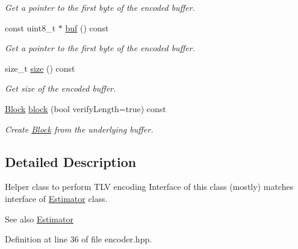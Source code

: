 \begin{DoxyCompactItemize}
\begin{DoxyCompactList}\small\item\em Get a pointer to the first byte of the encoded buffer. \end{DoxyCompactList}\item 
const uint8\+\_\+t $\ast$ \hyperlink{classndn_1_1encoding_1_1Encoder_a0cd115fa4809145fadc76aa6a9e0e504}{buf} () const\hypertarget{classndn_1_1encoding_1_1Encoder_a0cd115fa4809145fadc76aa6a9e0e504}{}\label{classndn_1_1encoding_1_1Encoder_a0cd115fa4809145fadc76aa6a9e0e504}

\begin{DoxyCompactList}\small\item\em Get a pointer to the first byte of the encoded buffer. \end{DoxyCompactList}\item 
size\+\_\+t \hyperlink{classndn_1_1encoding_1_1Encoder_ae5a65e998b6f12594897b30f9cf90943}{size} () const\hypertarget{classndn_1_1encoding_1_1Encoder_ae5a65e998b6f12594897b30f9cf90943}{}\label{classndn_1_1encoding_1_1Encoder_ae5a65e998b6f12594897b30f9cf90943}

\begin{DoxyCompactList}\small\item\em Get size of the encoded buffer. \end{DoxyCompactList}\item 
\hyperlink{classndn_1_1Block}{Block} \hyperlink{classndn_1_1encoding_1_1Encoder_a37a3f9744f1fe2be7b35a5fd7827bd3b}{block} (bool verify\+Length=true) const
\begin{DoxyCompactList}\small\item\em Create \hyperlink{classndn_1_1Block}{Block} from the underlying buffer. \end{DoxyCompactList}\end{DoxyCompactItemize}


\subsection{Detailed Description}
Helper class to perform T\+LV encoding Interface of this class (mostly) matches interface of \hyperlink{classndn_1_1encoding_1_1Estimator}{Estimator} class. 

\begin{DoxySeeAlso}{See also}
\hyperlink{classndn_1_1encoding_1_1Estimator}{Estimator} 
\end{DoxySeeAlso}


Definition at line 36 of file encoder.\+hpp.




